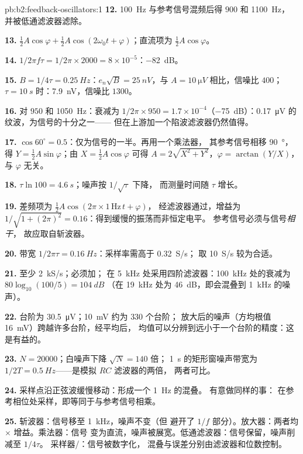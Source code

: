 \begin{solution}{pb:b2:feedback-oscillators:1}
\textbf{12.} \qty{100}{Hz} 与参考信号混频后得 $900$ 和 \qty{1100}{Hz}，
并被低通滤波器滤除。

\textbf{13.} $\tfrac12A\cos\varphi + \tfrac12A\cos(2\omega_0t + \varphi)$；直流项为 $\tfrac12A\cos\varphi$。

\textbf{14.} $1/2\pi f\tau = 1/2\pi \times 2000 = 8 \times 10^{-5}$：\qty{-82}{dB}。

\textbf{15.} $B = 1/4\tau = \qty{0.25}{Hz}$：$e_n\sqrt B = \qty{25}{nV}$，与 $A =
\qty{10}{\micro V}$ 相比，信噪比 $400$；$\tau = \qty{10}{s}$ 时：\qty{7.9}{nV}，信噪比 $1300$。

\textbf{16.} 对 $950$ 和 \qty{1050}{Hz}：衰减为 $1/2\pi \times 950 = 1.7 \times
10^{-4}$（\qty{-75}{dB}）：\qty{0.17}{\micro V} 的纹波，为信号的十分之一——
但在上游加一个陷波滤波器仍然值得。

\textbf{17.} $\cos60^\circ = 0.5$：仅为信号的一半。再用一个乘法器，
其参考信号相移 \qty{90}{\degree}，得 $Y = \tfrac12A\sin\varphi$；由 $X =
\tfrac12A\cos\varphi$ 可得 $A = 2\sqrt{X^2 + Y^2}$，$\varphi = \arctan(Y/X)$，与 $\varphi$ 无关。

\textbf{18.} $\tau\ln100 = \qty{4.6}{s}$；噪声按 $1/\sqrt\tau$ 下降，
而测量时间随 $\tau$ 增长。

\textbf{19.} 差频项为 $\tfrac12A\cos(2\pi \times 1\,\text{Hz}\,t + \varphi)$，
经滤波器通过，增益为 $1/\sqrt{1 + (2\pi)^2} = 0.16$：得到缓慢的振荡而非恒定电平。
参考信号必须与信号\emph{相干}，
故应取自斩波器。

\textbf{20.} 带宽 $1/2\pi\tau = \qty{0.16}{Hz}$：采样率需高于 \qty{0.32}{S/s}；
取 \qty{10}{S/s} 较为合适。

\textbf{21.} 至少 \qty{2}{kS/s}；必须加；
在 \qty{5}{kHz} 处采用四阶滤波器：\qty{100}{kHz} 处的衰减为 $80\log_{10}(100/5) = \qty{104}{dB}$
（在 \qty{19}{kHz} 处为 \qty{46}{dB}，即会混叠到 \qty{1}{kHz} 的噪声）。

\textbf{22.} 台阶为 \qty{30.5}{\micro V}；\qty{10}{mV} 约为 $330$ 个台阶；
放大后的噪声（方均根值 \qty{16}{mV}）跨越许多台阶，经平均后，
均值可以分辨到远小于一个台阶的精度：这是有益的。

\textbf{23.} $N = 20000$；白噪声下降 $\sqrt N = 140$ 倍；
\qty{1}{s} 的矩形窗噪声带宽为 $1/2T = \qty{0.5}{Hz}$——是模拟 $RC$ 滤波器的两倍，
两者可比。

\textbf{24.} 采样点沿正弦波缓慢移动：形成一个 \qty{1}{Hz} 的混叠。
有意做同样的事：
在参考相位处采样，即等同于与参考信号相乘。

\textbf{25.} 斩波器：信号移至 \qty{1}{kHz}，噪声不变（但
避开了 $1/f$ 部分）。放大器：两者均 $\times$ 增益。乘法器：信号
变为直流，噪声被展宽。低通滤波器：信号保留，噪声削减至 $1/4\tau$。
采样器/：信号被数字化，
混叠与误差分别由滤波器和位数控制。
\end{solution}
